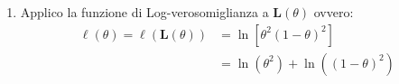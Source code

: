 \documentclass{article}  %
\theoremstyle{definition}
\begin{document}
\begin{esempio}
\begin{enumerate}
		      Quindi la probabilità di osservare
		      il campione $\vec{x}=(500,3000,100,7000)$ (in minuti) sarà:
		      \begin{align*}
			       & p_{\vec{X}}(\vec{x}; \theta)=                                                                                                                                                      \\
			       & =P(\vec{X}=\vec{x}; \theta)                                                                                                                                                        \\
			       & = P(X_1=1,X_2=0,X_3=1,X_4=0; \theta)                                                                                                                                               \\
			       & =\prod_{i=1}^{4}P(\vec{X_i}=\vec{x_i}; \theta)                                                                                                                                     \\
			       & =\prod_{i=1}^{4}\left(\theta^{x_i}(1-\theta)^{1-x_i}\right)                                                                                                                        \\
			       & =\left(\theta^{1}(1-\theta)^{1-1}\right) \cdot \left(\theta^{0}(1-\theta)^{1-0}\right) \cdot \left(\theta^{1}(1-\theta)^{1-1}\right) \cdot \left(\theta^{0}(1-\theta)^{1-0}\right) \\
			       & = \theta^{1+0+1+0}(1-\theta)^{(1+1+1+1)-(1+0+1+0)}                                                                                                                                 \\
			       & = \theta^{2}(1-\theta)^{4-(2)}                                                                                                                                                     \\
			       & = \theta^{2}(1-\theta)^2
		      \end{align*}
		      Ho trovato la funzione di verosomiglianza $\mathbf{L}(\theta) = \theta^{2}(1-\theta)^2$
		\item Applico la funzione di Log-verosomiglianza a $\mathbf{L}(\theta)$ ovvero:
		      \begin{align*}
			      \ell(\theta) = \ell(\mathbf{L}(\theta)) & = \ln\left[\theta^{2}(1-\theta)^2\right] \\
			                                              & = \ln(\theta^{2})+\ln((1-\theta)^2)      \\

\end{align*}
\end{enumerate}
\end{esempio}
\end{document}
